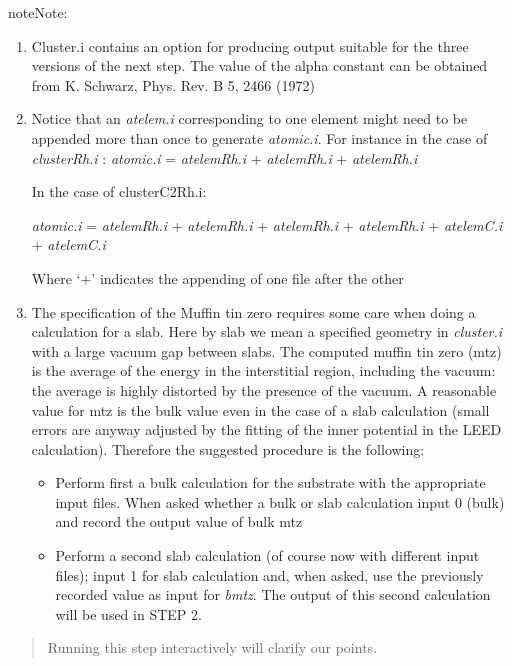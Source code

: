 \documentclass[letterpaper,10pt,english]{sphinxmanual}
\begin{document}
\begin{notice}{note}{Note:}\begin{enumerate}
\item {} 
Cluster.i contains an option for producing output suitable
for the three versions of the next step. The value
of the alpha constant can be obtained from
K. Schwarz, Phys. Rev. B 5, 2466 (1972)

\item {} 
Notice that an \emph{atelem.i} corresponding to one element
might need to be appended more than once to generate
\emph{atomic.i}. For instance in the case of \emph{clusterRh.i} :
\emph{atomic.i} = \emph{atelemRh.i} + \emph{atelemRh.i} + \emph{atelemRh.i}

In the case of clusterC2Rh.i:

\emph{atomic.i} = \emph{atelemRh.i} + \emph{atelemRh.i} + \emph{atelemRh.i} +
\emph{atelemRh.i} + \emph{atelemC.i} + \emph{atelemC.i}

Where `+' indicates the appending of one file after the other

\item {} 
The specification of the Muffin tin zero requires some
care when doing a calculation for a slab. Here by slab
we mean a specified geometry in \emph{cluster.i} with a large
vacuum gap between slabs. The computed muffin tin zero
(mtz) is the average of the energy in the interstitial
region, including the vacuum: the average is highly distorted
by the presence of the vacuum. A reasonable value for
mtz is the bulk value even in the case of a slab
calculation (small errors are anyway adjusted by the
fitting of the inner potential in the LEED calculation).
Therefore the suggested procedure is the following:
\begin{itemize}
\item {} 
Perform first a bulk calculation for the substrate
with the appropriate input files.  When asked whether
a bulk or slab calculation input  0 (bulk)
and record the output value of bulk mtz

\item {} 
Perform a second slab calculation
(of course now with different input files); input 1 for
slab calculation and, when asked, use the
previously recorded value as input for \emph{bmtz}.
The output of this second calculation will be used in
STEP 2.

\end{itemize}

\end{enumerate}
\begin{quote}

Running this step interactively will clarify our points.
\end{quote}
\end{notice}
\end{document}
